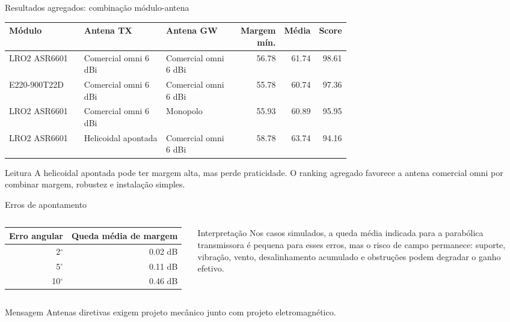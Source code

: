 \documentclass[aspectratio=169]{beamer}
\begin{document}
\begin{frame}{Resultados agregados: combinação módulo-antena}
\small
\begin{table}
\centering
\scriptsize
\begin{tabular}{p{0.22\linewidth}p{0.24\linewidth}p{0.20\linewidth}rrr}
\toprule
Módulo & Antena TX & Antena GW & Margem mín. & Média & Score \\
\midrule
LRO2 ASR6601 & Comercial omni 6 dBi & Comercial omni 6 dBi & 56.78 & 61.74 & 98.61 \\
E220-900T22D & Comercial omni 6 dBi & Comercial omni 6 dBi & 55.78 & 60.74 & 97.36 \\
LRO2 ASR6601 & Comercial omni 6 dBi & Monopolo & 55.93 & 60.89 & 95.95 \\
LRO2 ASR6601 & Helicoidal apontada & Comercial omni 6 dBi & 58.78 & 63.74 & 94.16 \\
\bottomrule
\end{tabular}
\end{table}
\begin{block}{Leitura}
A helicoidal apontada pode ter margem alta, mas perde praticidade. O ranking agregado favorece a antena comercial omni por combinar margem, robustez e instalação simples.
\end{block}
\end{frame}

\begin{frame}{Erros de apontamento}
\small
\begin{columns}[T,onlytextwidth]
\begin{table}
\centering
\begin{tabular}{rr}
\toprule
Erro angular & Queda média de margem \\
\midrule
2$^\circ$ & 0.02 dB \\
5$^\circ$ & 0.11 dB \\
10$^\circ$ & 0.46 dB \\
\bottomrule
\end{tabular}
\end{table}
\begin{block}{Interpretação}
Nos casos simulados, a queda média indicada para a parabólica transmissora é pequena para esses erros, mas o risco de campo permanece: suporte, vibração, vento, desalinhamento acumulado e obstruções podem degradar o ganho efetivo.
\end{block}
\end{columns}
\begin{block}{Mensagem}
Antenas diretivas exigem projeto mecânico junto com projeto eletromagnético.
\end{block}
\end{frame}
\end{document}
